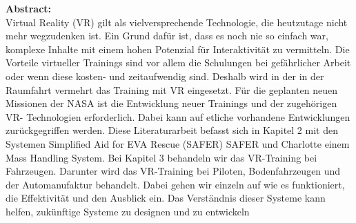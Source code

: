 {\small
\textbf{Abstract:}\\
Virtual Reality (VR) gilt als vielversprechende Technologie, die heutzutage nicht mehr
wegzudenken ist. Ein Grund dafür ist, dass es noch nie so einfach war, komplexe Inhalte mit
einem hohen Potenzial für Interaktivität zu vermitteln. Die Vorteile virtueller Trainings sind
vor allem die Schulungen bei gefährlicher Arbeit oder wenn diese kosten- und zeitaufwendig
sind. Deshalb wird in der in der Raumfahrt vermehrt das Training mit VR eingesetzt. Für die
geplanten neuen Missionen der NASA ist die Entwicklung neuer Trainings und der
zugehörigen VR- Technologien erforderlich. Dabei kann auf etliche vorhandene
Entwicklungen zurückgegriffen werden. Diese Literaturarbeit befasst sich in Kapitel 2 mit den Systemen
Simplified Aid for EVA Rescue (SAFER) SAFER und Charlotte einem Mass Handling
System.
Bei Kapitel 3 behandeln wir das VR-Training bei Fahrzeugen. Darunter wird das VR-Training bei Piloten, Bodenfahrzeugen und der Automanufaktur behandelt. Dabei gehen wir einzeln auf wie es funktioniert, die Effektivität und den Ausblick ein.
Das Verständnis dieser Systeme kann helfen, zukünftige Systeme zu designen und
zu entwickeln
}